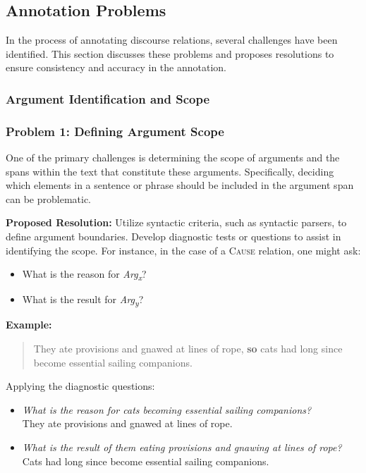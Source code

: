 \documentclass{udisc}
\begin{document}
\begin{itemize}
\subsection{Annotation Problems}

In the process of annotating discourse relations, several challenges have been identified. This section discusses these problems and proposes resolutions to ensure consistency and accuracy in the annotation.

\subsubsection{Argument Identification and Scope}

\subsubsection{Problem 1: Defining Argument Scope}

One of the primary challenges is determining the scope of arguments and the spans within the text that constitute these arguments. Specifically, deciding which elements in a sentence or phrase should be included in the argument span can be problematic.

\textbf{Proposed Resolution:} Utilize syntactic criteria, such as syntactic parsers, to define argument boundaries. Develop diagnostic tests or questions to assist in identifying the scope. For instance, in the case of a \textsc{Cause} relation, one might ask:

\begin{itemize}
    \item What is the reason for \textit{Arg\textsubscript{x}}?
    \item What is the result for \textit{Arg\textsubscript{y}}?
\end{itemize}

\textbf{Example:}

\begin{quote}
They ate provisions and gnawed at lines of rope, \textbf{so} cats had long since become essential sailing companions.
\end{quote}

Applying the diagnostic questions:

\begin{itemize}
    \item \textit{What is the reason for cats becoming essential sailing companions?} \\
    They ate provisions and gnawed at lines of rope.
    \item \textit{What is the result of them eating provisions and gnawing at lines of rope?} \\
    Cats had long since become essential sailing companions.
\end{itemize}


\end{itemize}
\end{document}
